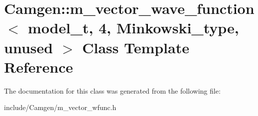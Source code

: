 \hypertarget{a00339}{}\section{Camgen\+:\+:m\+\_\+vector\+\_\+wave\+\_\+function$<$ model\+\_\+t, 4, Minkowski\+\_\+type, unused $>$ Class Template Reference}
\label{a00339}


The documentation for this class was generated from the following file\+:\begin{DoxyCompactItemize}
\item 
include/\+Camgen/m\+\_\+vector\+\_\+wfunc.\+h\end{DoxyCompactItemize}
